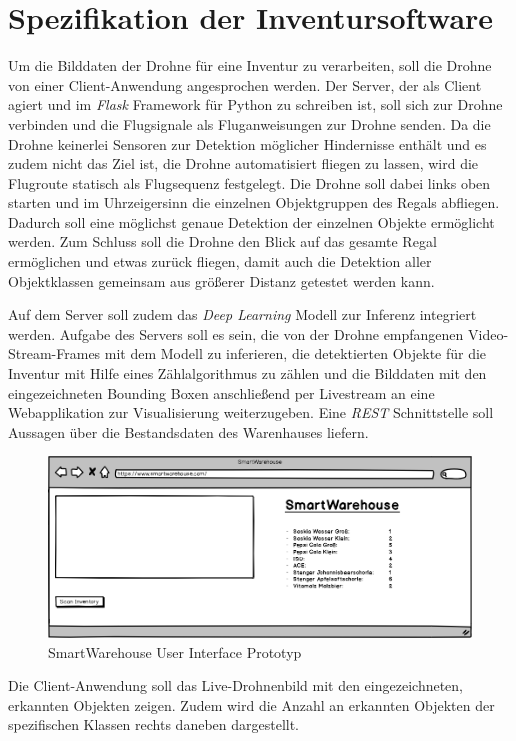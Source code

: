 \section{Spezifikation der Inventursoftware} \label{software}

Um die Bilddaten der Drohne für eine Inventur zu verarbeiten, soll die Drohne von einer Client-Anwendung angesprochen werden. Der Server, der als Client agiert und im \textit{Flask} Framework für Python zu schreiben ist, soll sich zur Drohne verbinden und die Flugsignale als Fluganweisungen zur Drohne senden. Da die Drohne keinerlei Sensoren zur Detektion möglicher Hindernisse enthält und es zudem nicht das Ziel ist, die Drohne automatisiert fliegen zu lassen, wird die Flugroute statisch als Flugsequenz festgelegt. Die Drohne soll dabei links oben starten und im Uhrzeigersinn die einzelnen Objektgruppen des Regals abfliegen. Dadurch soll eine möglichst genaue Detektion der einzelnen Objekte ermöglicht werden. Zum Schluss soll die Drohne den Blick auf das gesamte Regal ermöglichen und etwas zurück fliegen, damit auch die Detektion aller Objektklassen gemeinsam aus größerer Distanz getestet werden kann.

Auf dem Server soll zudem das \textit{Deep Learning} Modell zur Inferenz integriert werden. Aufgabe des Servers soll es sein, die von der Drohne empfangenen Video-Stream-Frames mit dem Modell zu inferieren, die detektierten Objekte für die Inventur mit Hilfe eines Zählalgorithmus zu zählen und die Bilddaten mit den eingezeichneten Bounding Boxen anschließend per Livestream an eine Webapplikation zur Visualisierung weiterzugeben. Eine \textit{REST} Schnittstelle soll Aussagen über die Bestandsdaten des Warenhauses liefern.

\begin{figure}[ht]
	\begin{center}
		\includegraphics[width=15cm]{Bilder/UI.png} 
		\caption[SmartWarehouse User Interface Prototyp]{SmartWarehouse User Interface Prototyp}
		\label{ui}
	\end{center}
\end{figure}

Die Client-Anwendung soll das Live-Drohnenbild mit den eingezeichneten, erkannten Objekten zeigen. Zudem wird die Anzahl an erkannten Objekten der spezifischen Klassen rechts daneben dargestellt. 
